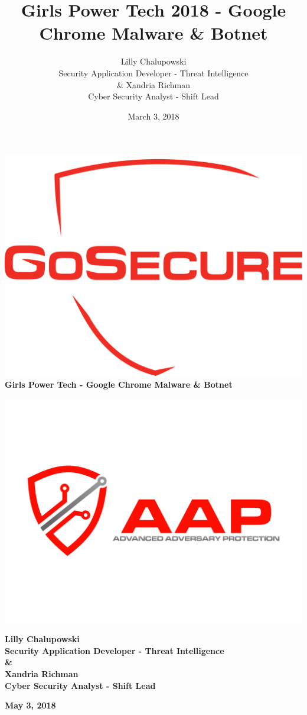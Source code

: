 \documentclass{article}
\title{Girls Power Tech 2018 - Google Chrome Malware \& Botnet}
\author{Lilly Chalupowski  \\
	Security Application Developer - Threat Intelligence  \\
	\& 
	Xandria Richman \\
	Cyber Security Analyst - Shift Lead \\
	}
\date{March 3, 2018}
\begin{document}
\begin{titlepage}
  \begin{center}
    \includegraphics[scale=0.05]{gosecure_logo}\\
    \bigskip
    \LARGE\textbf{Girls Power Tech - Google Chrome Malware \& Botnet}\\
  \end{center}
   \begin{center}
     \includegraphics[scale=0.3]{aap_logo}
   \end{center}
   \begin{center}
     \small\textbf{Lilly Chalupowski\\
      Security Application Developer - Threat Intelligence\\
      \smallskip
      \&\\
      \smallskip
      Xandria Richman\\
      Cyber Security Analyst - Shift Lead
    }\\
  \end{center}
  \begin{center}
    \large\textbf{May 3, 2018}\\
  \end{center}
\end{titlepage}
\end{document}
